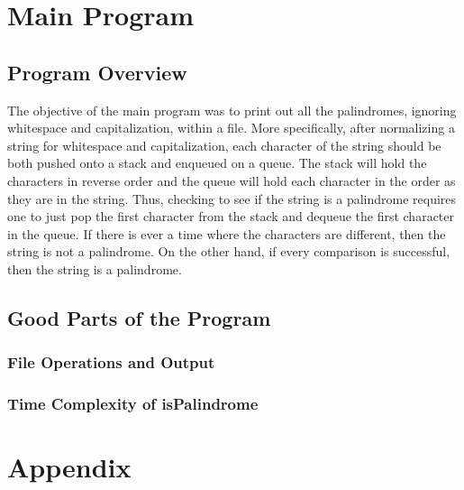\documentclass[letterpaper, 10pt,DIV=13]{scrartcl}
\numberwithin{equation}{section} %
\numberwithin{figure}{section} %
\numberwithin{table}{section} %
\begin{document}
\section{Main Program}
\subsection{Program Overview}
The objective of the main program was to print out all the palindromes, ignoring whitespace and capitalization, within a file. More specifically, after normalizing
a string for whitespace and capitalization, each character of the string should be both pushed onto a stack and enqueued on a queue. The stack will hold the
characters in reverse order and the queue will hold each character in the order as they are in the string. Thus, checking to see if the string is a palindrome requires
one to just pop the first character from the stack and dequeue the first character in the queue. If there is ever a time where the characters are different, then
the string is not a palindrome. On the other hand, if every comparison is successful, then the string is a palindrome.


\subsection{Good Parts of the Program}
\subsubsection{File Operations and Output}

\subsubsection{Time Complexity of isPalindrome}


\section{Appendix}
\lstset{numbers=left, numberstyle=\tiny, stepnumber=1, numbersep=5pt}

\end{document}
